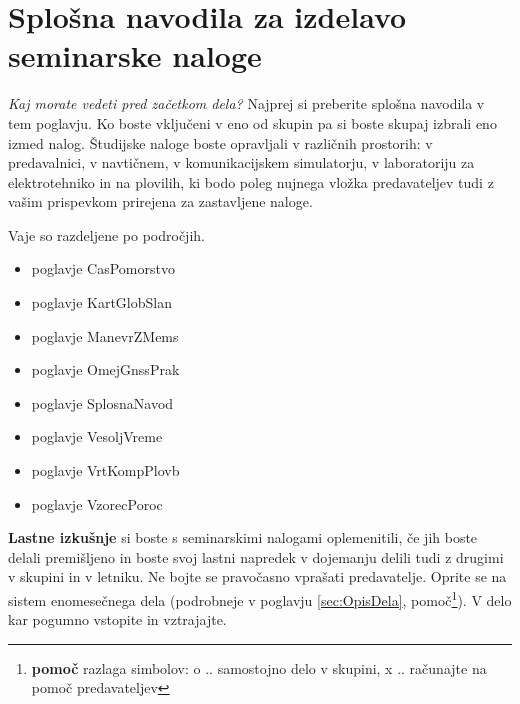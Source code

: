 %
\chapter{Splošna navodila za izdelavo seminarske naloge }
\label{ch:NavodSeminar}


\textit{Kaj morate vedeti pred začetkom dela?} Najprej si preberite splošna navodila v tem poglavju. Ko boste vključeni v eno od skupin pa si boste skupaj izbrali eno izmed nalog. Študijske naloge boste opravljali v različnih prostorih: v predavalnici, v navtičnem, v komunikacijskem simulatorju, v laboratoriju za elektrotehniko in na plovilih, ki bodo poleg nujnega vložka predavateljev tudi z vašim prispevkom prirejena za zastavljene naloge.

Vaje so razdeljene po področjih.
\begin{itemize}
	\item poglavje CasPomorstvo
	\item poglavje KartGlobSlan
	\item poglavje ManevrZMems
	\item poglavje OmejGnssPrak
	\item poglavje SplosnaNavod
	\item poglavje VesoljVreme
	\item poglavje VrtKompPlovb
	\item poglavje VzorecPoroc
\end{itemize}


\textbf{Lastne izkušnje} si boste s seminarskimi nalogami oplemenitili, če jih boste delali premišljeno in boste svoj lastni napredek v dojemanju delili tudi z drugimi v skupini in v letniku. Ne bojte se pravočasno vprašati predavatelje. Oprite se na sistem enomesečnega dela (podrobneje v poglavju \ref{sec:OpisDela}, pomoč\footnote{\textbf{pomoč} razlaga simbolov: o .. samostojno delo v skupini, x .. računajte na pomoč predavateljev}). V delo kar pogumno vstopite in vztrajajte.
 
